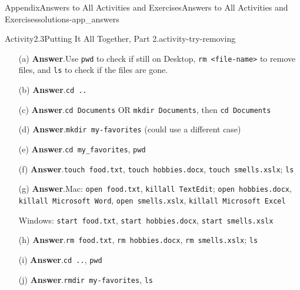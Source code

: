\documentclass[oneside,10pt,]{book}
\newcommand{\blocktitlefont}{\relax}
\newcommand{\mono}[1]{\texttt{#1}}
\begin{document}
\begin{solutions-chapter}{Appendix}{Answers to All Activities and Exercises}{}{Answers to All Activities and Exercises}{}{}{solutions-app_answers}
\begin{activitysolution}{Activity}{2.3}{Putting It All Together, Part 2.}{activity-try-removing}
\begin{enumerate}[font=\bfseries,label=(\alph*),ref=\alph*]%
\item[(a)]\noindent\textbf{\blocktitlefont Answer}.\hypertarget{answer-try-removing-d-b-back}{}\quad{}Use \mono{pwd} to check if still on Desktop, \mono{rm <file-name>} to remove files, and \mono{ls} to check if the files are gone.%
\item[(b)]\noindent\textbf{\blocktitlefont Answer}.\hypertarget{answer-try-removing-e-b-back}{}\quad{}\mono{cd ..}%
\item[(c)]\noindent\textbf{\blocktitlefont Answer}.\hypertarget{answer-try-removing-f-b-back}{}\quad{}\mono{cd Documents} OR \mono{mkdir Documents}, then \mono{cd Documents}%
\item[(d)]\noindent\textbf{\blocktitlefont Answer}.\hypertarget{answer-try-removing-g-b-back}{}\quad{}\mono{mkdir my-favorites} (could use a different case)%
\item[(e)]\noindent\textbf{\blocktitlefont Answer}.\hypertarget{answer-try-removing-h-b-back}{}\quad{}\mono{cd my\_favorites}, \mono{pwd}%
\item[(f)]\noindent\textbf{\blocktitlefont Answer}.\hypertarget{answer-try-removing-i-b-back}{}\quad{}\mono{touch food.txt}, \mono{touch hobbies.docx}, \mono{touch smells.xslx}; \mono{ls}%
\item[(g)]\noindent\textbf{\blocktitlefont Answer}.\hypertarget{answer-try-removing-j-b-back}{}\quad{}Mac: \mono{open food.txt}, \mono{killall TextEdit}; \mono{open hobbies.docx}, \mono{killall \textquotesingle{}Microsoft Word\textquotesingle{}}, \mono{open smells.xslx}, \mono{killall \textquotesingle{}Microsoft Excel\textquotesingle{}}%
\par
Windows: \mono{start food.txt}, \mono{start hobbies.docx}, \mono{start smells.xslx}%
\item[(h)]\noindent\textbf{\blocktitlefont Answer}.\hypertarget{answer-try-removing-k-b-back}{}\quad{}\mono{rm food.txt}, \mono{rm hobbies.docx}, \mono{rm smells.xslx}; \mono{ls}%
\item[(i)]\noindent\textbf{\blocktitlefont Answer}.\hypertarget{answer-try-removing-l-b-back}{}\quad{}\mono{cd ..}, \mono{pwd}%
\item[(j)]\noindent\textbf{\blocktitlefont Answer}.\hypertarget{answer-try-removing-m-b-back}{}\quad{}\mono{rmdir my-favorites}, \mono{ls}%
\end{enumerate}%
\end{activitysolution}%
\par\medskip

\end{solutions-chapter}
\end{document}
